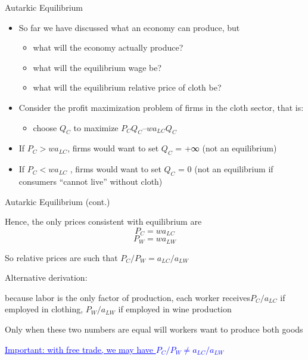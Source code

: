 \documentclass[10pt,hyperref={CJKbookmarks=true},xcolor=dvipsnames,aspectratio=169]{beamer}
\begin{document}
\begin{frame}{Autarkic Equilibrium}

\begin{itemize}
\item So far we have discussed what an economy can produce, but 

\begin{itemize}
\item what will the economy actually produce? 
\item what will the equilibrium wage be? 
\item what will the equilibrium relative price of cloth be? 
\end{itemize}
\item Consider the profit maximization problem of firms in the cloth sector,
that is:

\begin{itemize}
\item choose $Q_{C}$ to maximize $P_{C}Q_{C}{–}wa_{LC}Q_{C}$ 
\end{itemize}
\item If $P_{C}>wa_{LC}$, firms would want to set $Q_{C}$ = +∞ (not an
equilibrium) 
\item If $P_{C}<wa_{LC}$ , firms would want to set $Q_{C}$ = 0 (not an
equilibrium if consumers “cannot live” without cloth) 
\end{itemize}
\end{frame}

\begin{frame}{Autarkic Equilibrium (cont.) }


Hence, the only prices consistent with equilibrium are 
\[
P_{C}=wa_{LC}
\]
\[
P_{W}=wa_{LW}
\]


So relative prices are such that $P_{C}/P_{W}=a_{LC}/a_{LW}$

Alternative derivation: 

because labor is the only factor of production, each worker receives$P_{C}/a_{LC}$
if employed in clothing, $P_{W}/a_{LW}$ if employed in wine production 

Only when these two numbers are equal will workers want to produce
both goods 

\textcolor{blue}{\uline{Important: with free trade, we may have
$P_{C}/P_{W}\neq a_{LC}/a_{LW}$}}
\end{frame}
\end{document}
